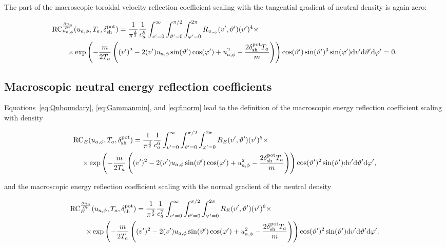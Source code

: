 \noindent The part of the macroscopic toroidal velocity reflection coefficient scaling with the tangential gradient of neutral density is again zero:

\begin{align}
    \mathrm{RC}_{u_{\mathrm{n},\phi}}^{\frac{\partial n_\mathrm{n}}{\partial \tau}} & (u_{a,\phi},T_a,\delta_{\mathrm{sh}}^{\mathrm{pot}}) =
    \frac{1}{\pi^\frac{3}{2}} \frac{1}{c_a^5} \int_{v'=0}^{\infty} \int_{\vartheta'=0}^{\pi/2} \int_{\varphi'=0}^{2\pi}
    R_{u_{\mathrm{n}\phi}}(v',\vartheta') (v')^4 \times \nonumber \\
    \times & \exp \left( - \frac{m}{2 T_a} \left( (v')^2-2 (v') u_{a,\phi} \sin (\vartheta') \cos (\varphi') + u_{a,\phi}^2 - \frac{2 \delta_{\mathrm{sh}}^{\mathrm{pot}} T_a}{m} \right) \right) \cos (\vartheta') \sin (\vartheta')^3 \sin (\varphi')
    \mathrm{d} v' \mathrm{d} \vartheta' \mathrm{d} \varphi' = 0.
\end{align}

\subsection{Macroscopic neutral energy reflection coefficients}

Equations~\eqref{eq:Qnboundary}, \eqref{eq:Gammanmin}, and \eqref{eq:finorm} lead to the definition of the macroscopic energy reflection coefficient scaling with density

\begin{align}
    \mathrm{RC}_{E} & (u_{a,\phi},T_a,\delta_{\mathrm{sh}}^{\mathrm{pot}}) =
            \frac{1}{\pi^\frac{3}{2}} \frac{1}{c_a^6} \int_{v'=0}^{\infty} \int_{\vartheta'=0}^{\pi/2} \int_{\varphi'=0}^{2\pi}
    R_E(v',\vartheta') (v')^5 \times \nonumber \\
    \times & \exp \left( - \frac{m}{2 T_a} \left( (v')^2-2 (v') u_{a,\phi} \sin (\vartheta') \cos (\varphi') + u_{a,\phi}^2 - \frac{2 \delta_{\mathrm{sh}}^{\mathrm{pot}} T_a}{m} \right) \right) \cos (\vartheta')^2 \sin (\vartheta')
    \mathrm{d} v' \mathrm{d} \vartheta' \mathrm{d} \varphi', \label{eq:reonei_def}
\end{align}

and the macroscopic energy reflection coefficient scaling with the normal gradient of the neutral density

\begin{align}
    \mathrm{RC}_{E}^{\frac{\partial n_\mathrm{n}}{\partial \nu}} & (u_{a,\phi},T_a,\delta_{\mathrm{sh}}^{\mathrm{pot}}) =
    \frac{1}{\pi^\frac{3}{2}} \frac{1}{c_a^7} \int_{v'=0}^{\infty} \int_{\vartheta'=0}^{\pi/2} \int_{\varphi'=0}^{2\pi}
    R_E(v',\vartheta') (v')^6 \times \nonumber \\
    \times & \exp \left( - \frac{m}{2 T_a} \left( (v')^2-2 (v') u_{a,\phi} \sin (\vartheta') \cos (\varphi') + u_{a,\phi}^2 - \frac{2 \delta_{\mathrm{sh}}^{\mathrm{pot}} T_a}{m} \right) \right) \cos (\vartheta')^2 \sin (\vartheta')
    \mathrm{d} v' \mathrm{d} \vartheta' \mathrm{d} \varphi'. \label{eq:retwoi_def}
\end{align}

